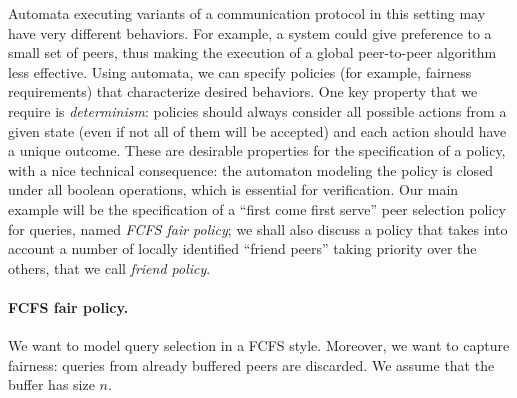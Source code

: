 Automata executing variants of a communication protocol in this setting may have very different behaviors. For example, a system could give preference to a small set of peers, thus making the execution of a global peer-to-peer algorithm less effective. Using automata, we can specify policies (for example, fairness requirements) that characterize desired behaviors. One key property that we require is \emph{determinism}: policies should always consider all possible actions from a given state (even if not all of them will be accepted) and each action should have a unique outcome. These are desirable properties for the specification of a policy, with a nice technical consequence: the automaton modeling the policy is closed under all boolean operations, which is essential for verification.
%
Our main example will be the %
specification of a ``first come first serve'' peer selection policy for queries, named \emph{FCFS fair policy}; we shall also discuss a policy that takes into account a number of locally identified ``friend peers'' taking priority over the others, that we call \emph{friend policy}. 



\paragraph{FCFS fair policy.}
We want to model query selection in a FCFS style. Moreover, we want to capture fairness: queries from already buffered peers are discarded. We assume that the buffer has size $n$. 


